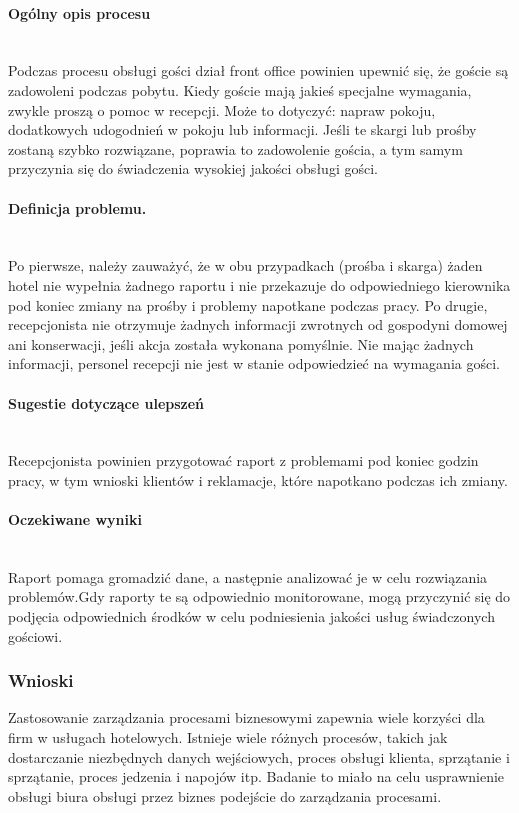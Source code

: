 \documentclass[a4paper, 12pt]{article}
\begin{document}
\paragraph{Ogólny opis procesu}\mbox{}\\
\hspace{1cm} Podczas procesu obsługi gości dział front office powinien upewnić się, że goście są zadowoleni podczas pobytu. Kiedy goście mają jakieś specjalne wymagania, zwykle proszą o pomoc w recepcji. Może to dotyczyć: napraw pokoju, dodatkowych udogodnień w pokoju lub informacji. Jeśli te skargi lub prośby zostaną szybko rozwiązane, poprawia to zadowolenie gościa, a tym samym przyczynia się do świadczenia wysokiej jakości obsługi gości.
\paragraph{Definicja problemu.}\mbox{}\\
Po pierwsze, należy zauważyć, że w obu przypadkach (prośba i skarga) żaden hotel nie wypełnia żadnego raportu i nie przekazuje do odpowiedniego kierownika pod koniec zmiany na prośby i problemy napotkane podczas pracy. Po drugie, recepcjonista nie otrzymuje żadnych informacji zwrotnych od gospodyni domowej ani konserwacji, jeśli akcja została wykonana pomyślnie. Nie mając żadnych informacji, personel recepcji nie jest w stanie odpowiedzieć na wymagania gości.
\paragraph{Sugestie dotyczące ulepszeń}\mbox{}\\
Recepcjonista powinien przygotować raport z problemami pod koniec godzin pracy, w tym wnioski klientów i reklamacje, które napotkano podczas ich zmiany.

\paragraph{Oczekiwane wyniki}\mbox{}\\
Raport pomaga gromadzić dane, a następnie analizować je w celu rozwiązania problemów.Gdy raporty te są odpowiednio monitorowane, mogą przyczynić się do podjęcia odpowiednich środków w celu podniesienia jakości usług świadczonych gościowi.

\subsubsection{Wnioski}
Zastosowanie zarządzania procesami biznesowymi zapewnia wiele korzyści dla firm w usługach hotelowych. Istnieje wiele różnych procesów, takich jak dostarczanie niezbędnych danych wejściowych, proces obsługi klienta, sprzątanie i sprzątanie, proces jedzenia i napojów itp. Badanie to miało na celu usprawnienie obsługi biura obsługi przez biznes podejście do zarządzania procesami.
\end{document}
